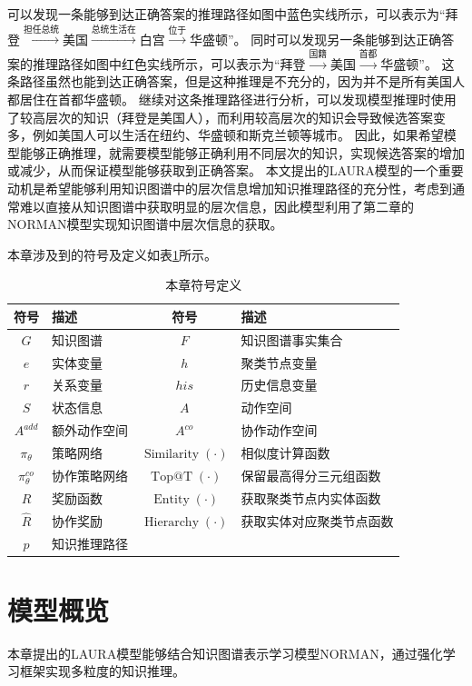 \documentclass[algorithmlist, AutoFakeBold, AutoFakeSlant, figurelist, tablelist, nomlist, engineering, openany]{seuthesix} %
\begin{document}
可以发现一条能够到达正确答案的推理路径如图中蓝色实线所示，可以表示为“拜登$\xrightarrow{\mbox{担任总统}}$美国$\xrightarrow{\mbox{总统生活在}}$白宫$\xrightarrow{\mbox{位于}}$华盛顿”。
同时可以发现另一条能够到达正确答案的推理路径如图中红色实线所示，可以表示为“拜登$\xrightarrow{\mbox{国籍}}$美国$\xrightarrow{\mbox{首都}}$华盛顿”。
这条路径虽然也能到达正确答案，但是这种推理是不充分的，因为并不是所有美国人都居住在首都华盛顿。
继续对这条推理路径进行分析，可以发现模型推理时使用了较高层次的知识（拜登是美国人），而利用较高层次的知识会导致候选答案变多，例如美国人可以生活在纽约、华盛顿和斯克兰顿等城市。
因此，如果希望模型能够正确推理，就需要模型能够正确利用不同层次的知识，实现候选答案的增加或减少，从而保证模型能够获取到正确答案。
本文提出的LAURA模型的一个重要动机是希望能够利用知识图谱中的层次信息增加知识推理路径的充分性，考虑到通常难以直接从知识图谱中获取明显的层次信息，因此模型利用了第二章的NORMAN模型实现知识图谱中层次信息的获取。

本章涉及到的符号及定义如表\ref{3_symbols}所示。
\begin{table}[ht]
  \centering
  \caption{本章符号定义}
  \begin{tabular*}{0.8\textwidth}{@{\extracolsep{\fill}}clcl}
		\toprule[1pt]
    符号 & 描述 & 符号 & 描述\\ \hline
    $G$ & 知识图谱 & $F$ & 知识图谱事实集合\\
    $e$ & 实体变量 & $h$ & 聚类节点变量\\
    $r$ & 关系变量 & $his$ & 历史信息变量\\
    $S$ & 状态信息 & $A$ & 动作空间\\
    $A^{add}$ & 额外动作空间 & $A^{co}$ & 协作动作空间\\
    $\pi_\theta$ & 策略网络 & $\operatorname{Similarity}(\cdot)$ & 相似度计算函数\\
    $\pi_\theta^{co}$ & 协作策略网络 & $\operatorname{Top@T}(\cdot)$ & 保留最高得分三元组函数\\
    $R$ & 奖励函数 & $\operatorname{Entity}(\cdot)$ & 获取聚类节点内实体函数\\
    $\hat{R}$ & 协作奖励 & $\operatorname{Hierarchy}(\cdot)$ & 获取实体对应聚类节点函数\\
    $p$ & 知识推理路径 & &\\
		\bottomrule[1pt]
	\end{tabular*}
  \label{3_symbols}
\end{table}

\section{模型概览}
本章提出的LAURA模型能够结合知识图谱表示学习模型NORMAN，通过强化学习框架实现多粒度的知识推理。
\end{document}
